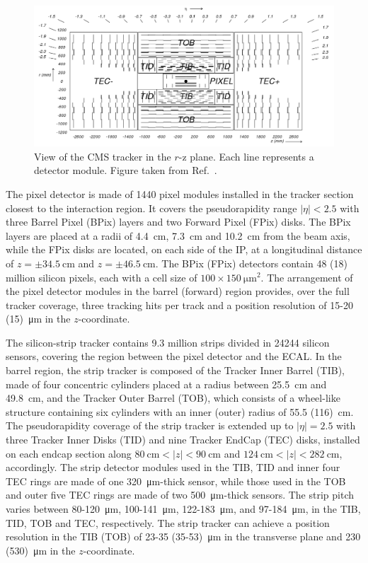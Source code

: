 \begin{figure}[!htbp]
 \centering
 \includegraphics[width=1.0\textwidth]{Figures/Experiment/CMS/Tracker.png}
 \caption{View of the CMS tracker in the $r$-z plane. Each line represents a detector module. Figure taken from Ref.~\cite{CMS}.}
 \label{fig:CMS_Tracker}
\end{figure}

The pixel detector is made of 1440 pixel modules installed in the tracker section closest to the interaction region. It covers the pseudorapidity range $|\eta|<2.5$ with three Barrel Pixel (BPix) layers and two Forward Pixel (FPix) disks. The BPix layers are placed at a radii of \SI{4.4}{\cm}, \SI{7.3}{\cm} and \SI{10.2}{\cm} from the beam axis, while the FPix disks are located, on each side of the IP, at a longitudinal distance of $z={\pm}\SI{34.5}{\cm}$ and $z={\pm}\SI{46.5}{\cm}$. The BPix (FPix) detectors contain 48 (18) million silicon pixels, each with a cell size of $100{\times}\SI{150}{\um\squared}$. The arrangement of the pixel detector modules in the barrel (forward) region provides, over the full tracker coverage, three tracking hits per track and a position resolution of 15-20 (15)~\si{\um} in the $z$-coordinate.

The silicon-strip tracker contains 9.3 million strips divided in 24244 silicon sensors, covering the region between the pixel detector and the ECAL. In the barrel region, the strip tracker is composed of the Tracker Inner Barrel (TIB), made of four concentric cylinders placed at a radius between \SI{25.5}{\cm} and \SI{49.8}{\cm}, and the Tracker Outer Barrel (TOB), which consists of a wheel-like structure containing six cylinders with an inner (outer) radius of 55.5 (116)~\si{\cm}. The pseudorapidity coverage of the strip tracker is extended up to $|\eta|=2.5$ with three Tracker Inner Disks (TID) and nine Tracker EndCap (TEC) disks, installed on each endcap section along $\SI{80}{\cm} < |z| < \SI{90}{\cm}$ and $\SI{124}{\cm} < |z| < \SI{282}{\cm}$, accordingly. The strip detector modules used in the TIB, TID and inner four TEC rings are made of one \SI{320}{\um}-thick sensor, while those used in the TOB and outer five TEC rings are made of two \SI{500}{\um}-thick sensors. The strip pitch varies between 80-\SI{120}{\um}, 100-\SI{141}{\um}, 122-\SI{183}{\um}, and 97-\SI{184}{\um}, in the TIB, TID, TOB and TEC, respectively. The strip tracker can achieve a position resolution in the TIB (TOB) of 23-35 (35-53)~\si{\um} in the transverse plane and 230 (530)~\si{\um} in the $z$-coordinate.


